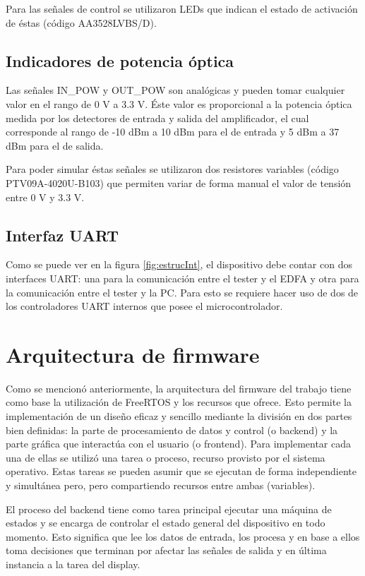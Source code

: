 Para las señales de control se utilizaron LEDs que indican el estado de activación de éstas (código AA3528LVBS/D).

\subsection{Indicadores de potencia óptica}

Las señales IN\_POW y OUT\_POW son analógicas y pueden tomar cualquier valor en el rango de 0 V a 3.3 V. Éste valor es proporcional a la potencia óptica medida por los detectores de entrada y salida del amplificador, el cual corresponde al rango de -10 dBm a 10 dBm para el de entrada y 5 dBm a 37 dBm para el de salida.

Para poder simular éstas señales se utilizaron dos resistores variables (código PTV09A-4020U-B103) que permiten variar de forma manual el valor de tensión entre 0 V y 3.3 V.

\subsection{Interfaz UART}

Como se puede ver en la figura \ref{fig:estrucInt}, el dispositivo debe contar con dos interfaces UART: una para la comunicación entre el tester y el EDFA y otra para la comunicación entre el tester y la PC. Para esto se requiere hacer uso de dos de los controladores UART internos que posee el microcontrolador.

\section{Arquitectura de firmware}

Como se mencionó anteriormente, la arquitectura del firmware del trabajo tiene como base la utilización de FreeRTOS y los recursos que ofrece. Esto permite la implementación de un diseño eficaz y sencillo mediante la división en dos partes bien definidas: la parte de procesamiento de datos y control (o backend) y la parte gráfica que interactúa con el usuario (o frontend). Para implementar cada una de ellas se utilizó una tarea o proceso, recurso provisto por el sistema operativo. Estas tareas se pueden asumir que se ejecutan de forma independiente y simultánea pero, pero compartiendo recursos entre ambas (variables).

El proceso del backend tiene como tarea principal ejecutar una máquina de estados y se encarga de controlar el estado general del dispositivo en todo momento. Esto significa que lee los datos de entrada, los procesa y en base a ellos toma decisiones que terminan por afectar las señales de salida y en última instancia a la tarea del display.

